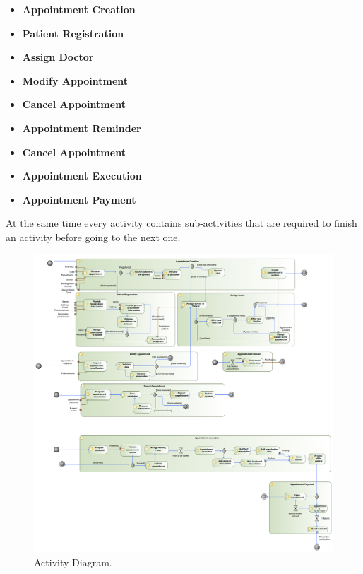 \documentclass{article}
\begin{document}
            \begin{itemize}
                    \item \textbf{Appointment Creation}
                    \item \textbf{Patient Registration}
                    \item \textbf{Assign Doctor}
                    \item \textbf{Modify Appointment}
                    \item \textbf{Cancel Appointment}
                    \item \textbf{Appointment Reminder}
                    \item \textbf{Cancel Appointment}
                    \item \textbf{Appointment Execution}
                    \item \textbf{Appointment Payment}
            \end{itemize}

            At the same time every activity contains sub-activities that are required to finish an activity before going to the next one.
            
            \begin{figure}[H]
                \centering 
                \includegraphics[width=1\linewidth]{./img/Activity.png}
                \caption{Activity Diagram.}
                \label{fig:activity}
            \end{figure}
\end{document}
